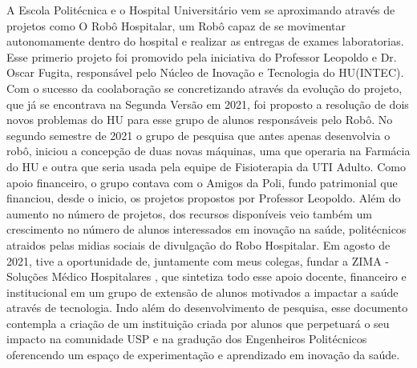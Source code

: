 \documentclass[../poliXuniversity_hospital_(USP)_report.tex]{subfiles}
\begin{document}
A Escola Politécnica e o Hospital Universitário vem se aproximando através de projetos como O Robô Hospitalar, um Robô capaz de se movimentar autonomamente dentro do hospital e realizar as entregas de exames laboratorias. Esse primerio projeto foi promovido pela iniciativa do Professor Leopoldo e Dr. Oscar Fugita, responsável pelo Núcleo de Inovação e Tecnologia do HU(INTEC). Com o sucesso da coolaboração se concretizando através da evolução do projeto, que já se encontrava na Segunda Versão em 2021, foi proposto a resolução de dois novos problemas do HU para esse grupo de alunos responsáveis pelo Robô. No segundo semestre de 2021 o grupo de pesquisa que antes apenas desenvolvia o robô, iniciou a concepção de duas novas máquinas, uma que operaria na Farmácia do HU e outra que seria usada pela equipe de Fisioterapia da UTI Adulto. Como apoio financeiro, o grupo contava com o Amigos da Poli, fundo patrimonial que financiou, desde o inicio, os projetos propostos por Professor Leopoldo. Além do aumento no número de projetos, dos recursos disponíveis veio também um crescimento no número de alunos interessados em inovação na saúde, politécnicos atraidos pelas midias sociais de divulgação do Robo Hospitalar. Em agosto de 2021, tive a oportunidade de, juntamente com meus colegas, fundar a ZIMA - Soluções Médico Hospitalares \cite{ZIMA}, que sintetiza todo esse apoio docente, financeiro e institucional em um grupo de extensão de alunos motivados a impactar a saúde através de tecnologia. Indo além do desenvolvimento de pesquisa, esse documento contempla a criação de um instituição criada por alunos que perpetuará o seu impacto na comunidade USP e na gradução dos Engenheiros Politécnicos oferencendo um espaço de experimentação e aprendizado em inovação da saúde.
\end{document}
